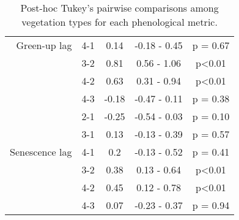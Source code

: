 \begin{table}[H]
\begin{tabular}{rcccc}
  Green-up lag & 4-1 &  0.14 & -0.18 - 0.45 & p = 0.67 \\ 
   & 3-2 &  0.81 & 0.56 - 1.06 & p<0.01 \\ 
   & 4-2 &  0.63 & 0.31 - 0.94 & p<0.01 \\ 
   & 4-3 & -0.18 & -0.47 - 0.11 & p = 0.38 \\ 
   \hline
 & 2-1 & -0.25 & -0.54 - 0.03 & p = 0.10 \\ 
   & 3-1 &  0.13 & -0.13 - 0.39 & p = 0.57 \\ 
  Senescence lag & 4-1 &   0.2 & -0.13 - 0.52 & p = 0.41 \\ 
   & 3-2 &  0.38 & 0.13 - 0.64 & p<0.01 \\ 
   & 4-2 &  0.45 & 0.12 - 0.78 & p<0.01 \\ 
   & 4-3 &  0.07 & -0.23 - 0.37 & p = 0.94 \\ 
   \hline
\end{tabular}
\caption{Post-hoc Tukey's pairwise comparisons among vegetation types for each phenological metric.} 
\label{tukey_terms}
\end{table}

